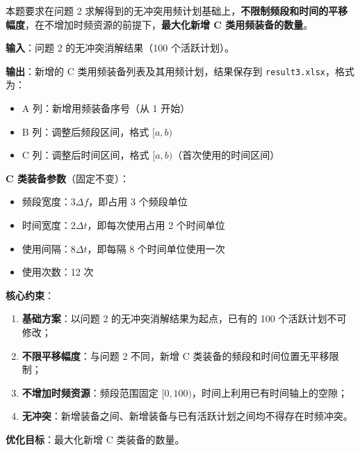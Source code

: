 
本题要求在问题 2 求解得到的无冲突用频计划基础上，\textbf{不限制频段和时间的平移幅度}，在不增加时频资源的前提下，\textbf{最大化新增 C 类用频装备的数量}。

\textbf{输入}：问题 2 的无冲突消解结果（100 个活跃计划）。

\textbf{输出}：新增的 C 类用频装备列表及其用频计划，结果保存到 \texttt{result3.xlsx}，格式为：
\begin{itemize}
    \item A 列：新增用频装备序号（从 1 开始）
    \item B 列：调整后频段区间，格式 $[a, b)$
    \item C 列：调整后时间区间，格式 $[a, b)$（首次使用的时间区间）
\end{itemize}

\textbf{C 类装备参数}（固定不变）：
\begin{itemize}
    \item 频段宽度：$3\Delta f$，即占用 3 个频段单位
    \item 时间宽度：$2\Delta t$，即每次使用占用 2 个时间单位
    \item 使用间隔：$8\Delta t$，即每隔 8 个时间单位使用一次
    \item 使用次数：12 次
\end{itemize}

\textbf{核心约束}：
\begin{enumerate}
    \item \textbf{基础方案}：以问题 2 的无冲突消解结果为起点，已有的 100 个活跃计划不可修改；
    \item \textbf{不限平移幅度}：与问题 2 不同，新增 C 类装备的频段和时间位置无平移限制；
    \item \textbf{不增加时频资源}：频段范围固定 $[0, 100)$，时间上利用已有时间轴上的空隙；
    \item \textbf{无冲突}：新增装备之间、新增装备与已有活跃计划之间均不得存在时频冲突。
\end{enumerate}

\textbf{优化目标}：最大化新增 C 类装备的数量。
